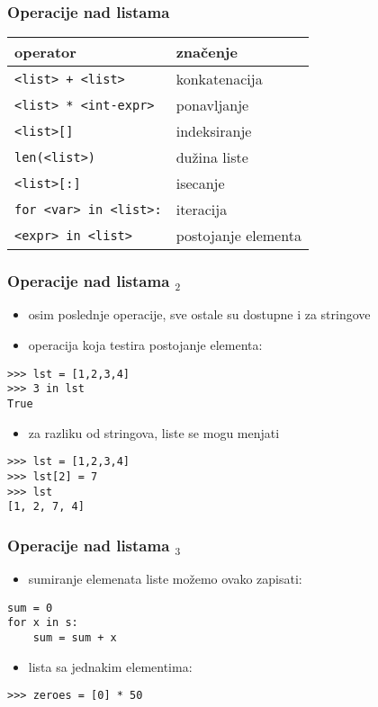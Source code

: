 \documentclass[utf8,compress,aspectratio=169]{beamer}
\begin{document}
\begin{frame}[fragile]
  \frametitle{Operacije nad listama}
\begin{center}
\begin{tabular}{l|l}
\textbf{operator} & \textbf{značenje} \\ \hline
\texttt{<list> + <list>} & konkatenacija \\
\texttt{<list> * <int-expr>} & ponavljanje \\
\texttt{<list>[]} & indeksiranje \\
\texttt{len(<list>)} & dužina liste \\
\texttt{<list>[:]} & isecanje \\
\texttt{for <var> in <list>:} & iteracija \\
\texttt{<expr> in <list>} & postojanje elementa
\end{tabular}
\end{center}
\end{frame}

\begin{frame}[fragile]
  \frametitle{Operacije nad listama $_2$}
  \begin{itemize}
    \item osim poslednje operacije, sve ostale su dostupne i za stringove
    \item operacija koja testira postojanje elementa:
  \end{itemize}
\begin{verbatim}
>>> lst = [1,2,3,4]
>>> 3 in lst
True
\end{verbatim}
  \begin{itemize}
    \item za razliku od stringova, liste se mogu menjati
  \end{itemize}
\begin{verbatim}
>>> lst = [1,2,3,4]
>>> lst[2] = 7
>>> lst
[1, 2, 7, 4]
\end{verbatim}
\end{frame}

\begin{frame}[fragile]
  \frametitle{Operacije nad listama $_3$}
  \begin{itemize}
    \item sumiranje elemenata liste možemo ovako zapisati:
  \end{itemize}
\begin{verbatim}
sum = 0
for x in s:
    sum = sum + x
\end{verbatim}
  \begin{itemize}
    \item lista sa jednakim elementima:
  \end{itemize}
\begin{verbatim}
>>> zeroes = [0] * 50
\end{verbatim}
\end{frame}
\end{document}
